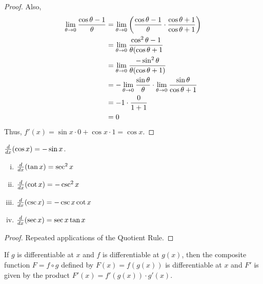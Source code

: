\documentclass[a4paper,11pt]{article}
\begin{document}
\begin{outline}
\begin{proof}
      Also,
      \begin{align*}
        \lim\limits_{\theta\rightarrow 0^{}}\frac{\cos{\theta}-1}{\theta}
          &= \lim\limits_{\theta\rightarrow 0^{}}\left(\frac{\cos{\theta}-1}{\theta}\cdot\frac{\cos{\theta}+1}{\cos{\theta}+1}\right)\\
          &= \lim\limits_{\theta\rightarrow 0^{}}\frac{\cos^2\theta-1}{\theta(\cos{\theta}+1}\\
          &= \lim\limits_{\theta\rightarrow 0^{}}\frac{-\sin^2\theta}{\theta(\cos{\theta}+1)}\\
          &= -\lim\limits_{\theta\rightarrow 0^{}}\frac{\sin{\theta}}{\theta}\cdot\lim\limits_{\theta\rightarrow 0^{}}\frac{\sin{\theta}}{\cos{\theta}+1}\\
          &= -1\cdot\frac{0}{1+1}\\
          &= 0
      \end{align*}
      Thus, \(f'(x) = \sin{x}\cdot 0 + \cos{x}\cdot 1 = \cos{x}\).
    \end{proof}
    
    \(\frac{d}{dx}(\cos{x}) = -\sin{x}\).
    
    \begin{enumerate}[i.]
      \item \(\frac{d}{dx}(\tan{x})=\sec^2{x}\)
      \item \(\frac{d}{dx}(\cot{x})=-\csc^2{x}\)
      \item \(\frac{d}{dx}(\csc{x})=-\csc{x}\cot{x}\)
      \item \(\frac{d}{dx}(\sec{x})=\sec{x}\tan{x}\)
    \end{enumerate}
    
    \begin{proof}
      Repeated applications of the Quotient Rule.
    \end{proof}
    
    If \(g\) is differentiable at \(x\) and \(f\) is differentiable at \(g(x)\), then the composite
    function \(F=f\circ g\) defined by \(F(x)=f(g(x))\) is differentiable at \(x\) and \(F'\) is given
    by the product \(F'(x)=f'(g(x))\cdot g'(x)\).
    

\end{outline}
\end{document}
